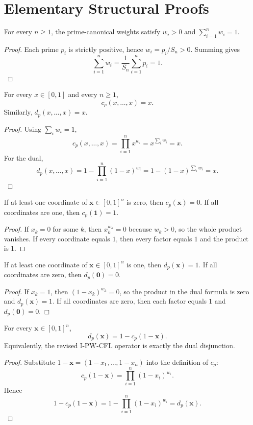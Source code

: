 \documentclass[11pt]{article}
\begin{document}
\section{Elementary Structural Proofs}
\begin{proposition}
For every $n \ge 1$, the prime-canonical weights satisfy $w_i>0$ and $\sum_{i=1}^n w_i=1$.
\end{proposition}
\begin{proof}
Each prime $p_i$ is strictly positive, hence $w_i=p_i/S_n>0$. Summing gives
\[
\sum_{i=1}^n w_i = \frac{1}{S_n}\sum_{i=1}^n p_i = 1.
\]
\end{proof}

\begin{proposition}[Idempotency]
For every $x\in[0,1]$ and every $n\ge1$,
\[
 c_p(x,\dots,x)=x.
\]
Similarly, $d_p(x,\dots,x)=x$.
\end{proposition}
\begin{proof}
Using $\sum_i w_i=1$,
\[
 c_p(x,\dots,x)=\prod_{i=1}^n x^{w_i}=x^{\sum_i w_i}=x.
\]
For the dual,
\[
 d_p(x,\dots,x)=1-\prod_{i=1}^n (1-x)^{w_i}=1-(1-x)^{\sum_i w_i}=x.
\]
\end{proof}

\begin{proposition}
If at least one coordinate of $\mathbf{x}\in[0,1]^n$ is zero, then $c_p(\mathbf{x})=0$. If all coordinates are one, then $c_p(\mathbf{1})=1$.
\end{proposition}
\begin{proof}
If $x_k=0$ for some $k$, then $x_k^{w_k}=0$ because $w_k>0$, so the whole product vanishes. If every coordinate equals $1$, then every factor equals $1$ and the product is $1$.
\end{proof}

\begin{proposition}
If at least one coordinate of $\mathbf{x}\in[0,1]^n$ is one, then $d_p(\mathbf{x})=1$. If all coordinates are zero, then $d_p(\mathbf{0})=0$.
\end{proposition}
\begin{proof}
If $x_k=1$, then $(1-x_k)^{w_k}=0$, so the product in the dual formula is zero and $d_p(\mathbf{x})=1$. If all coordinates are zero, then each factor equals $1$ and $d_p(\mathbf{0})=0$.
\end{proof}

\begin{theorem}
For every $\mathbf{x}\in[0,1]^n$,
\[
 d_p(\mathbf{x}) = 1 - c_p(1-\mathbf{x}).
\]
Equivalently, the revised I-PW-CFL operator is exactly the dual disjunction.
\end{theorem}
\begin{proof}
Substitute $1-\mathbf{x}=(1-x_1,\dots,1-x_n)$ into the definition of $c_p$:
\[
 c_p(1-\mathbf{x}) = \prod_{i=1}^n (1-x_i)^{w_i}.
\]
Hence
\[
 1-c_p(1-\mathbf{x}) = 1-\prod_{i=1}^n (1-x_i)^{w_i} = d_p(\mathbf{x}).
\]
\end{proof}
\end{document}
